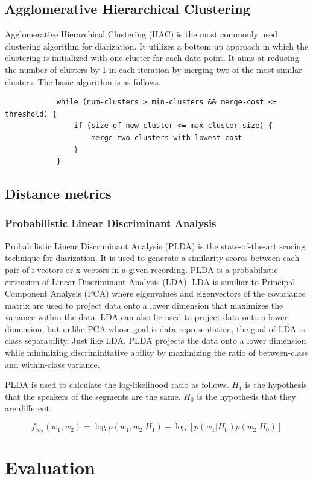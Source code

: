 	\subsection{Agglomerative Hierarchical Clustering}
		Agglomerative Hierarchical Clustering (HAC) is the most commonly used clustering algorithm for diarization. It utilizes a bottom up approach in which the clustering is initialized with one cluster for each data point. It aims at reducing the number of clusters by 1 in each iteration by merging two of the most similar clusters. The basic algorithm is as follows.
		
		\begin{verbatim}
			while (num-clusters > min-clusters && merge-cost <= threshold) {
			    if (size-of-new-cluster <= max-cluster-size) {
			        merge two clusters with lowest cost
			    }
			}
		\end{verbatim}

	\subsection{Distance metrics}
		\subsubsection{Probabilistic Linear Discriminant Analysis}
		Probabilistic Linear Discriminant Analysis (PLDA) is the state-of-the-art scoring technique for diarization. It is used to generate a similarity scores between each pair of i-vectors or x-vectors in a given recording. PLDA is a probabilistic extension of Linear Discriminant Analysis (LDA). LDA is similiar to Principal Component Analysis (PCA) where eigenvalues and eigenvectors of the covariance matrix are used to project data onto a lower dimension that maximizes the variance within the data. LDA can also be used to project data onto a lower dimension, but unlike PCA whose goal is data representation, the goal of LDA is class separability. Just like LDA, PLDA projects the data onto a lower dimension while minimizing discriminitative ability by maximizing the ratio of between-class and within-class variance.
		
		PLDA is used to calculate the log-likelihood ratio as follows. $H_1$ is the hypothesis that the speakers of the segments are the same. $H_0$ is the hypothesis that they are different.
		
		$$ f_{cos}(w_1,w_2) =  \log p(w_1, w_2 | H_1) - \log [ p(w_1|H_0)  p(w_2|H_0) ] $$

\section{Evaluation}

